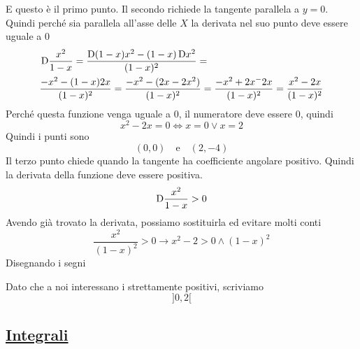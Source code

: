 E questo è il primo punto. Il secondo richiede la tangente parallela a $y=0$. Quindi perché sia
parallela all'asse delle $X$ la derivata nel suo punto deve essere uguale a $0$
\begin{align*}
  &\mathop{}\!\mathrm{D} \frac{x^2}{1-x} = \frac{\mathop{}\!\mathrm{D}(1-x)x^2-(1-x)\mathop{}\!\mathrm{D} x^2}{(1-x)^2}=\\
  &\frac{-x^2-(1-x)2x}{(1-x)^2}=
  \frac{-x^2-(2x-2x^2)}{(1-x)^2} = \frac{-x^2+2x^-2x}{(1-x)^2}=\frac{x^2-2x}{(1-x)^2}
\end{align*}
Perché questa funzione venga uguale a $0$, il numeratore deve essere $0$, quindi
\begin{equation*}
  x^2-2x=0 \Leftrightarrow x=0\lor x=2 
\end{equation*}
Quindi i punti sono
\begin{equation*}
  \boxed{(0,0)\quad\text{e}\quad(2,-4)}
\end{equation*}
Il terzo punto chiede quando la tangente ha coefficiente angolare positivo. Quindi la derivata
della funzione deve essere positiva.
\begin{equation*}
  \mathop{}\!\mathrm{D} \frac{x^2}{1-x}>0
\end{equation*}
Avendo già trovato la derivata, possiamo sostituirla ed evitare molti conti
\begin{equation*}
  \frac{x^2}{(1-x)^2}>0 \rightarrow x^2-2>0\land(1-x)^2
\end{equation*}
Disegnando i segni
\begin{center}
\end{center}
Dato che a noi interessano i strettamente positivi, scriviamo
\begin{equation*}
  \boxed{{]{0},{2}[}}
\end{equation*}

\subsection*{\hyperref[sec:integrali]{Integrali}}
\label{ex:integrali}


